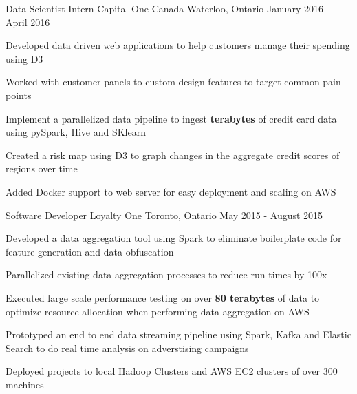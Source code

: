 \begin{cventries}

\cventry
{Data Scientist Intern}
{Capital One Canada}
{Waterloo, Ontario}
{January 2016 - April 2016}
{ %
\begin{cvitems}
\item {Developed data driven web applications to help customers manage their spending using D3}
\item {Worked with customer panels to custom design features to target common pain points}
\item {Implement a parallelized data pipeline to ingest \textbf{terabytes} of credit card data using pySpark, Hive and SKlearn}
\item {Created a risk map using D3 to graph changes in the aggregate credit scores of regions over time}
\item {Added Docker support to web server for easy deployment and scaling on AWS}
\end{cvitems}
}


\cventry
{Software Developer}
{Loyalty One} %
{Toronto, Ontario} %
{May 2015 - August 2015} %
{
\begin{cvitems}
\item {Developed a data aggregation tool using Spark to eliminate boilerplate code for feature generation and data obfuscation}
\item {Parallelized existing data aggregation processes to reduce run times by 100x}
\item {Executed large scale performance testing on over \textbf{80 terabytes} of data to optimize resource allocation when performing data aggregation on AWS}
\item {Prototyped an end to end data streaming pipeline using Spark, Kafka and Elastic Search to do real time analysis on adverstising campaigns}
\item {Deployed projects to local Hadoop Clusters and AWS EC2 clusters of over 300 machines}
\end{cvitems}
}


\end{cventries}
